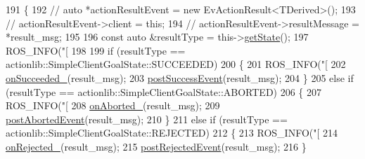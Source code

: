 \begin{DoxyCode}
191     \{
192         \textcolor{comment}{// auto *actionResultEvent = new EvActionResult<TDerived>();}
193         \textcolor{comment}{// actionResultEvent->client = this;}
194         \textcolor{comment}{// actionResultEvent->resultMessage = *result\_msg;}
195 
196         \textcolor{keyword}{const} \textcolor{keyword}{auto} &resultType = this->\hyperlink{classsmacc_1_1client__bases_1_1SmaccActionClientBase_a97192acd7bb7cac5de0191e700ab72ee}{getState}();
197         ROS\_INFO(\textcolor{stringliteral}{"[%
198 
199         \textcolor{keywordflow}{if} (resultType == actionlib::SimpleClientGoalState::SUCCEEDED)
200         \{
201             ROS\_INFO(\textcolor{stringliteral}{"[%
202             \hyperlink{classsmacc_1_1client__bases_1_1SmaccActionClientBase_afa1d615e16c9e825d815a3a3ccaa61df}{onSucceeded\_}(result\_msg);
203             \hyperlink{classsmacc_1_1client__bases_1_1SmaccActionClientBase_afb4f82508cd653d496392f321e84a783}{postSuccessEvent}(result\_msg);
204         \}
205         \textcolor{keywordflow}{else} \textcolor{keywordflow}{if} (resultType == actionlib::SimpleClientGoalState::ABORTED)
206         \{
207             ROS\_INFO(\textcolor{stringliteral}{"[%
208             \hyperlink{classsmacc_1_1client__bases_1_1SmaccActionClientBase_adc33748ca4fcef9730f8039b75d496d0}{onAborted\_}(result\_msg);
209             \hyperlink{classsmacc_1_1client__bases_1_1SmaccActionClientBase_a9ca2952ededeec233ee6d8a9a39c680b}{postAbortedEvent}(result\_msg);
210         \}
211         \textcolor{keywordflow}{else} \textcolor{keywordflow}{if} (resultType == actionlib::SimpleClientGoalState::REJECTED)
212         \{
213             ROS\_INFO(\textcolor{stringliteral}{"[%
214             \hyperlink{classsmacc_1_1client__bases_1_1SmaccActionClientBase_a4c878cbf2684701323e2b36668f7d721}{onRejected\_}(result\_msg);
215             \hyperlink{classsmacc_1_1client__bases_1_1SmaccActionClientBase_a04cb60c48127e5534c1ce7045fb5abdc}{postRejectedEvent}(result\_msg);
216         \}
}}}}
\end{DoxyCode}

